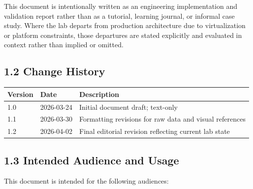 \documentclass[11pt]{article}
\begin{document}
This document is intentionally written as an engineering implementation and validation report rather than as a tutorial, learning journal, or informal case study. Where the lab departs from production architecture due to virtualization or platform constraints, those departures are stated explicitly and evaluated in context rather than implied or omitted.


\subsection{1.2 Change History}
\label{sec:change-history}

\begin{center}
\begin{tabular}{|l|l|l|}
\hline
\textbf{Version} & \textbf{Date} & \textbf{Description} \\
\hline
1.0 & 2026-03-24 & Initial document draft; text-only \\
\hline
1.1 & 2026-03-30 & Formatting revisions for raw data and visual references \\
\hline
1.2 & 2026-04-02 & Final editorial revision reflecting current lab state \\
\end{tabular}
\end{center}


\subsection{1.3 Intended Audience and Usage}
\label{sec:intended-audience-and-usage}

This document is intended for the following audiences:
\end{document}

